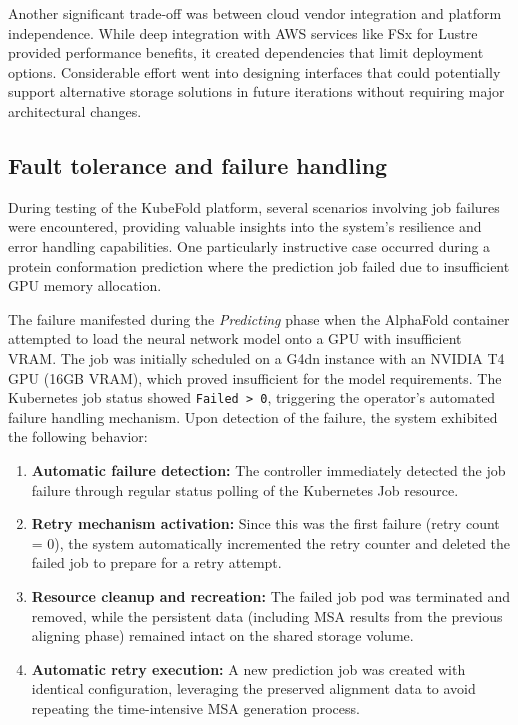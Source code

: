 Another significant trade-off was between cloud vendor integration and platform independence. While deep integration with AWS services like FSx for Lustre provided performance benefits, it created dependencies that limit deployment options. Considerable effort went into designing interfaces that could potentially support alternative storage solutions in future iterations without requiring major architectural changes.

\subsection{Fault tolerance and failure handling}

During testing of the KubeFold platform, several scenarios involving job failures were encountered, providing valuable insights into the system's resilience and error handling capabilities. One particularly instructive case occurred during a protein conformation prediction where the prediction job failed due to insufficient GPU memory allocation.

The failure manifested during the \textit{Predicting} phase when the AlphaFold container attempted to load the neural network model onto a GPU with insufficient VRAM. The job was initially scheduled on a G4dn instance with an NVIDIA T4 GPU (16GB VRAM), which proved insufficient for the model requirements. The Kubernetes job status showed \texttt{Failed > 0}, triggering the operator's automated failure handling mechanism. Upon detection of the failure, the system exhibited the following behavior:

\begin{enumerate}
    \item \textbf{Automatic failure detection:} The controller immediately detected the job failure through regular status polling of the Kubernetes Job resource.
    
    \item \textbf{Retry mechanism activation:} Since this was the first failure (retry count = 0), the system automatically incremented the retry counter and deleted the failed job to prepare for a retry attempt.
    
    \item \textbf{Resource cleanup and recreation:} The failed job pod was terminated and removed, while the persistent data (including MSA results from the previous aligning phase) remained intact on the shared storage volume.
    
    \item \textbf{Automatic retry execution:} A new prediction job was created with identical configuration, leveraging the preserved alignment data to avoid repeating the time-intensive MSA generation process.
\end{enumerate}

